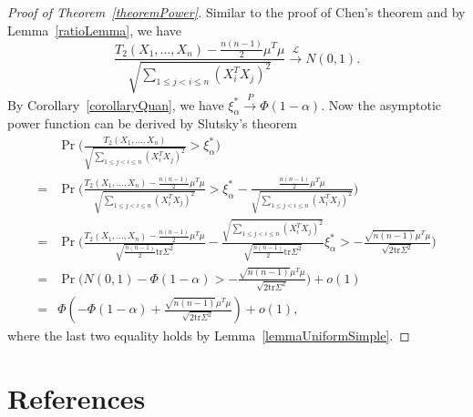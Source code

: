 \documentclass[review]{elsarticle}
\theoremstyle{plain}
\theoremstyle{definition}
\theoremstyle{remark}
\begin{document}
\begin{proof}[Proof of Theorem~\ref{theoremPower}]
    Similar to the proof of Chen's theorem and by Lemma~\ref{ratioLemma}, we have
    \begin{equation}
        \frac{T_2(X_1,\ldots,X_n)-\frac{n(n-1)}{2}\mu^T\mu}{\sqrt{\sum_{1\leq j< i\leq n}(X_i^T X_j)^2}}\xrightarrow{\mathcal{L}}N(0,1).
    \end{equation}
    By Corollary~\ref{corollaryQuan}, we have $\xi_{\alpha}^*\xrightarrow{P} \Phi(1-\alpha)$.
    Now the asymptotic power function can be derived by Slutsky's theorem
    \begin{equation}
        \begin{aligned}
            &\Pr\Big(\frac{T_2( X_1,\ldots, X_n)}{\sqrt{\sum_{1\leq j<i\leq n}{(X_i^T X_j)}^2}}>\xi_{\alpha}^* \Big)\\
            =&
            \Pr\Big(\frac{T_2( X_1,\ldots, X_n)-\frac{n(n-1)}{2}\mu^T\mu}{\sqrt{\sum_{1\leq j<i\leq n}{(X_i^T X_j)}^2}}>\xi_{\alpha}^*-\frac{\frac{n(n-1)}{2}\mu^T\mu}{\sqrt{\sum_{1\leq j<i\leq n}{(X_i^T X_j)}^2}} \Big)\\
            =&
            \Pr\Big(\frac{T_2( X_1,\ldots, X_n)-\frac{n(n-1)}{2}\mu^T\mu}{\sqrt{\frac{n(n-1)}{2}\mathrm{tr}\Sigma^2}}-
            \frac{\sqrt{\sum_{1\leq j<i\leq n}{(X_i^T X_j)}^2}}{\sqrt{\frac{n(n-1)}{2}\mathrm{tr}\Sigma^2}}\xi_{\alpha}^*>
            -\frac{\sqrt{n(n-1)}\mu^T\mu}{\sqrt{2\mathrm{tr}\Sigma^2}} \Big)\\
            =&
            \Pr\Big(N(0,1)-\Phi(1-\alpha)>-\frac{\sqrt{n(n-1)}\mu^T\mu}{\sqrt{2\mathrm{tr}\Sigma^2}}\Big)+o(1)\\
            =&
            \Phi(-\Phi(1-\alpha)+\frac{\sqrt{n(n-1)}\mu^T\mu}{\sqrt{2\mathrm{tr}\Sigma^2}})+o(1),
        \end{aligned}
    \end{equation}
    where the last two equality holds by Lemma~\ref{lemmaUniformSimple}.



\end{proof}




\section*{References}


\end{document}
